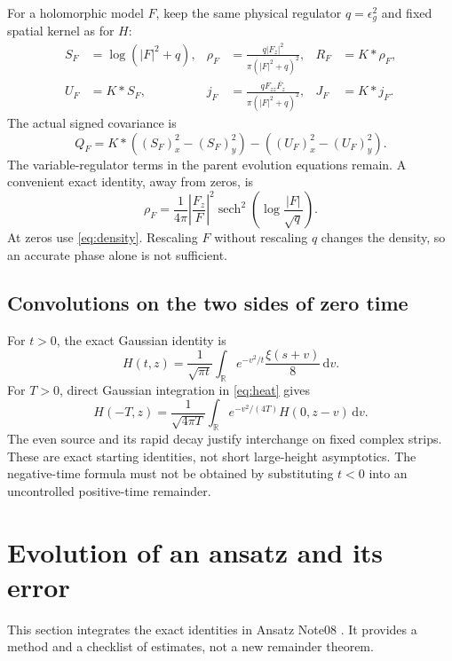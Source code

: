 \documentclass[11pt]{article}
\newcommand{\R}{\mathbb R}
\newcommand{\dd}{\,\mathrm d}
\newcommand{\epsg}{\epsilon_g}
\newcommand{\sech}{\operatorname{sech}}
\numberwithin{equation}{section}
\begin{document}
For a holomorphic model \(F\), keep the same physical regulator
\(q=\epsg^2\) and fixed spatial kernel as for \(H\):
\begin{align}
S_F&=\log(|F|^2+q),&
\rho_F&=\frac{q|F_z|^2}{\pi(|F|^2+q)^2},&
R_F&=K*\rho_F, \label{eq:density}\\
U_F&=K*S_F,&
j_F&=\frac{qF_{zz}\overline{F_z}}{\pi(|F|^2+q)^2},&
J_F&=K*j_F. \label{eq:current}
\end{align}
The actual signed covariance is
\begin{equation}
Q_F=K*((S_F)_x^2-(S_F)_y^2)
       -((U_F)_x^2-(U_F)_y^2).
\label{eq:covariance}
\end{equation}
The variable-regulator terms in the parent evolution equations remain.
A convenient exact identity, away from zeros, is
\begin{equation}
\rho_F=\frac1{4\pi}\left|\frac{F_z}{F}\right|^2
 \sech^2\!\left(\log\frac{|F|}{\sqrt q}\right).
\label{eq:sech}
\end{equation}
At zeros use \eqref{eq:density}. Rescaling \(F\) without rescaling \(q\)
changes the density, so an accurate phase alone is not sufficient.

\subsection{Convolutions on the two sides of zero time}
For \(t>0\), the exact Gaussian identity \cite[Eq.~(35)]{polymath} is
\begin{equation}
H(t,z)=\frac1{\sqrt{\pi t}}\int_\R e^{-v^2/t}
                      \frac{\xi(s+v)}8\dd v.       \label{eq:positive-anchor}
\end{equation}
For \(T>0\), direct Gaussian integration in \eqref{eq:heat} gives
\begin{equation}
H(-T,z)=\frac1{\sqrt{4\pi T}}\int_\R e^{-v^2/(4T)}
                                      H(0,z-v)\dd v. \label{eq:negative-anchor}
\end{equation}
The even source and its rapid decay justify interchange on fixed
complex strips. These are exact starting identities, not short
large-height asymptotics. The negative-time formula must not be obtained
by substituting \(t<0\) into an uncontrolled positive-time remainder.

\section{Evolution of an ansatz and its error}
\label{sec:evolution}
This section integrates the exact identities in Ansatz Note08
\cite{ansatz08}. It provides a method and a checklist of estimates,
not a new remainder theorem.
\end{document}
